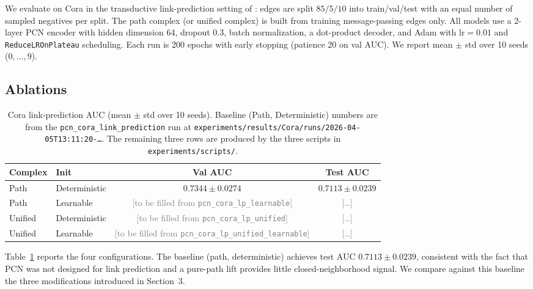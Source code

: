 \documentclass[11pt]{article}
\newcommand{\pcn}{\textsc{PCN}}
\begin{document}
We evaluate on Cora in the transductive link-prediction setting of
\citet{kipf2016variational}: edges are split $85/5/10$ into
train/val/test with an equal number of sampled negatives per split.
The path complex (or unified complex) is built from training
message-passing edges only. All models use a 2-layer \pcn{} encoder
with hidden dimension 64, dropout 0.3, batch normalization, a dot-product
decoder, and Adam with $\text{lr}=0.01$ and
\texttt{ReduceLROnPlateau} scheduling. Each run is 200 epochs with
early stopping (patience 20 on val AUC). We report mean $\pm$ std over
10 seeds ($0,\ldots,9$).

\subsection{Ablations}

\begin{table}[t]
  \centering
  \small
  \begin{tabular}{llcc}
    \toprule
    Complex & Init & Val AUC & Test AUC \\
    \midrule
    Path      & Deterministic & $0.7344 \pm 0.0274$ & $0.7113 \pm 0.0239$ \\
    Path      & Learnable     & \textcolor{gray}{[to be filled from \texttt{pcn\_cora\_lp\_learnable}]} & \textcolor{gray}{[\ldots]} \\
    Unified   & Deterministic & \textcolor{gray}{[to be filled from \texttt{pcn\_cora\_lp\_unified}]} & \textcolor{gray}{[\ldots]} \\
    Unified   & Learnable     & \textcolor{gray}{[to be filled from \texttt{pcn\_cora\_lp\_unified\_learnable}]} & \textcolor{gray}{[\ldots]} \\
    \bottomrule
  \end{tabular}
  \caption{Cora link-prediction AUC (mean $\pm$ std over 10 seeds).
    Baseline (Path, Deterministic) numbers are from the
    \texttt{pcn\_cora\_link\_prediction} run at
    \texttt{experiments/results/Cora/runs/2026-04-05T13:11:20-\ldots}.
    The remaining three rows are produced by the three scripts in
  \texttt{experiments/scripts/}.}
  \label{tab:ablation}
\end{table}

Table~\ref{tab:ablation} reports the four configurations. The baseline
(path, deterministic) achieves test AUC $0.7113 \pm 0.0239$, consistent
with the fact that \pcn{} was not designed for link prediction and a
pure-path lift provides little closed-neighborhood signal. We compare
against this baseline the three modifications introduced in
Section~3.
\end{document}
